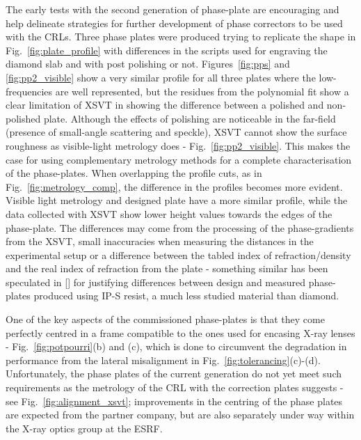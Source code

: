 \begin{refsection}
The early tests with the second generation of phase-plate are encouraging and help delineate strategies for further development of phase correctors to be used with the CRLs. Three phase plates were produced trying to replicate the shape in Fig.~\ref{fig:plate_profile} with differences in the scripts used for engraving the diamond slab and with post polishing or not. Figures~\ref{fig:pps} and \ref{fig:pp2_visible} show a very similar profile for all three plates where the low-frequencies are well represented, but the residues from the polynomial fit show a clear limitation of XSVT in showing the difference between a polished and non-polished plate. Although the effects of polishing are noticeable in the far-field (presence of small-angle scattering and speckle), XSVT cannot show the surface roughness as visible-light metrology does - Fig.~\ref{fig:pp2_visible}. This makes the case for using complementary metrology methods for a complete characterisation of the phase-plates. When overlapping the profile cuts, as in Fig.~\ref{fig:metrology_comp}, the difference in the profiles becomes more evident. Visible light metrology and designed plate have a more similar profile, while the data collected with XSVT show lower height values towards the edges of the phase-plate. The differences may come from the processing of the phase-gradients from the XSVT, small inaccuracies when measuring the distances in the experimental setup or a difference between the tabled index of refraction/density and the real index of refraction from the plate - something similar has been speculated in [\cite[\textit{§3.2}]{Seiboth2020}] for justifying differences between design and measured phase-plates produced using IP-S resist, a much less studied material than diamond. 

One of the key aspects of the commissioned phase-plates is that they come perfectly centred in a frame compatible to the ones used for encasing X-ray lenses - Fig.~\ref{fig:potpourri}(b) and (c), which is done to circumvent the degradation in performance from the lateral misalignment in Fig.~\ref{fig:tolerancing}(c)-(d). Unfortunately, the phase plates of the current generation do not yet meet such requirements as the metrology of the CRL with the correction plates suggests - see Fig.~\ref{fig:alignment_xsvt}; improvements in the centring of the phase plates are expected from the partner company, but are also separately under way within the X-ray optics group at the ESRF. 


\end{refsection}
